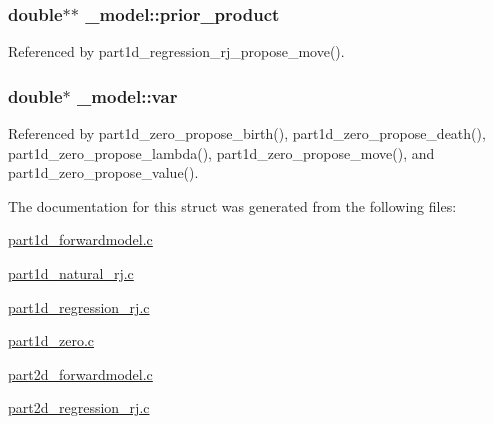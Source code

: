 \subsubsection[{\texorpdfstring{prior\+\_\+product}{prior_product}}]{\setlength{\rightskip}{0pt plus 5cm}double$\ast$$\ast$ \+\_\+model\+::prior\+\_\+product}\hypertarget{struct__model_aea5c339dc1034d87d6f75eb5053dc5ae}{}\label{struct__model_aea5c339dc1034d87d6f75eb5053dc5ae}


Referenced by part1d\+\_\+regression\+\_\+rj\+\_\+propose\+\_\+move().

\subsubsection[{\texorpdfstring{var}{var}}]{\setlength{\rightskip}{0pt plus 5cm}double$\ast$ \+\_\+model\+::var}\hypertarget{struct__model_a5a2a2194e021abae94ecbaa09655bee8}{}\label{struct__model_a5a2a2194e021abae94ecbaa09655bee8}


Referenced by part1d\+\_\+zero\+\_\+propose\+\_\+birth(), part1d\+\_\+zero\+\_\+propose\+\_\+death(), part1d\+\_\+zero\+\_\+propose\+\_\+lambda(), part1d\+\_\+zero\+\_\+propose\+\_\+move(), and part1d\+\_\+zero\+\_\+propose\+\_\+value().



The documentation for this struct was generated from the following files\+:\begin{DoxyCompactItemize}
\item 
\hyperlink{part1d__forwardmodel_8c}{part1d\+\_\+forwardmodel.\+c}\item 
\hyperlink{part1d__natural__rj_8c}{part1d\+\_\+natural\+\_\+rj.\+c}\item 
\hyperlink{part1d__regression__rj_8c}{part1d\+\_\+regression\+\_\+rj.\+c}\item 
\hyperlink{part1d__zero_8c}{part1d\+\_\+zero.\+c}\item 
\hyperlink{part2d__forwardmodel_8c}{part2d\+\_\+forwardmodel.\+c}\item 
\hyperlink{part2d__regression__rj_8c}{part2d\+\_\+regression\+\_\+rj.\+c}\end{DoxyCompactItemize}
